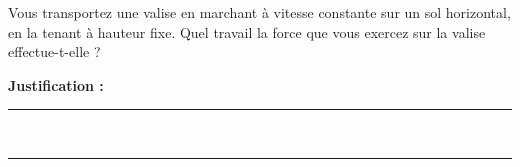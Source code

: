 Vous transportez une valise en marchant à vitesse constante sur un sol horizontal, en la tenant à hauteur fixe. Quel travail la force que vous exercez sur la valise effectue-t-elle ?

\choices

\noindent\textbf{Justification :} \hrulefill \\[2.5ex]
\rule{\linewidth}{0.4pt} \\[2.5ex]
\rule{\linewidth}{0.4pt}
\vfill
